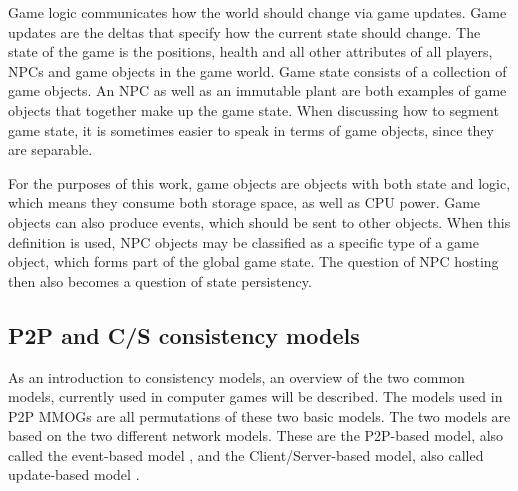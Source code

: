 \documentclass[journal,oneside,a4paper,onecolumn]{IEEEtran}
\begin{document}
Game logic communicates how the world should change via game updates. Game updates are the deltas that specify how the current state should change. The state of the game is the positions, health and all other attributes of all players, NPCs and game objects in the game world. Game state consists of a collection of game objects. An NPC as well as an immutable plant are both examples of game objects that together make up the game state. When discussing how to segment game state, it is sometimes easier to speak in terms of game objects, since they are separable.

For the purposes of this work, game objects are objects with both state and logic, which means they consume both storage space, as well as CPU power. Game objects can also produce events, which should be sent to other objects. When this definition is used, NPC objects may be classified as a specific type of a game object, which forms part of the global game state. The question of NPC hosting then also becomes a question of state persistency.

\subsection{P2P and C/S consistency models}
\label{classic_models}

As an introduction to consistency models, an overview of the two common models, currently used in computer games will be described. The models used in P2P MMOGs are all permutations of these two basic models. The two models are based on the two different network models. These are the P2P-based model, also called the event-based model \cite{p2p_cm_aoe}, and the Client/Server-based model, also called update-based model \cite{unreal_networking}.
\end{document}

